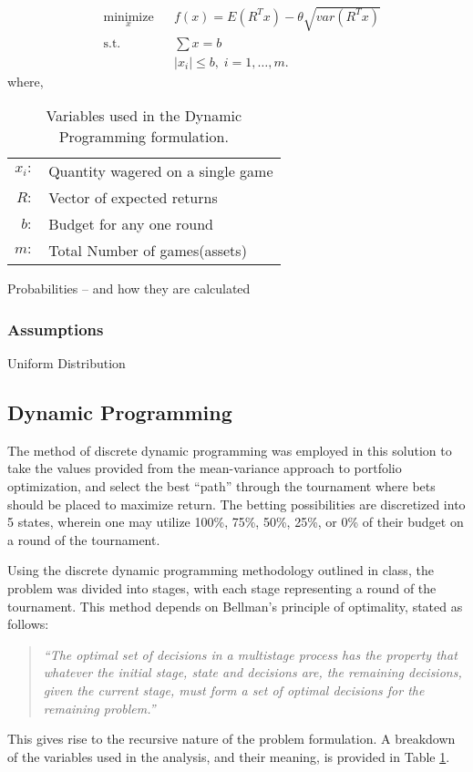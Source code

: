 \documentclass[12pt]{article}
\begin{document}
\begin{equation*}
\begin{aligned}
& \underset{x}{\text{minimize}}
& & f(x) =  E(R^Tx)-\theta\sqrt{var(R^Tx)}\\
& \text{s.t.}
& & \sum{x}=b\\
&&& |x_i| \leq b, \; i = 1, \ldots, m.
\end{aligned}
\end{equation*}
where,

\begin{table}[htbp!]
\begin{centering}
    \begin{tabular}{r l}
    $x_i:$        & Quantity wagered on a single game \\ 
    $R:$        & Vector of expected returns             \\ 
    $b:$        & Budget for any one round            \\ 
    $m:$        & Total Number of games(assets)    \\ 
    \end{tabular}
    \label{dp_vars}
    \caption{Variables used in the Dynamic Programming formulation.}
\end{centering}
\end{table}

Probabilities -- and how they are calculated

\subsubsection{Assumptions}


Uniform Distribution

\subsection{Dynamic Programming}
The method of discrete dynamic programming was employed in this solution to take the values provided from the mean-variance approach to portfolio optimization, and select the best ``path'' through the tournament where bets should be placed to maximize return.
The betting possibilities are discretized into 5 states, wherein one may utilize 100\%, 75\%, 50\%, 25\%, or 0\% of their budget on a round of the tournament.

Using the discrete dynamic programming methodology outlined in class, the problem was divided into stages, with each stage representing a round of the tournament.
This method depends on Bellman's principle of optimality, stated as follows:
\begin{quote}
\emph{``The optimal set of decisions in a multistage process has the property that whatever the initial stage, state and decisions are, the remaining decisions, given the current stage, must form a set of optimal decisions for the remaining problem.''}
\end{quote}
This gives rise to the recursive nature of the problem formulation.
A breakdown of the variables used in the analysis, and their meaning, is provided in Table \ref{dp_vars}. \\
\end{document}
